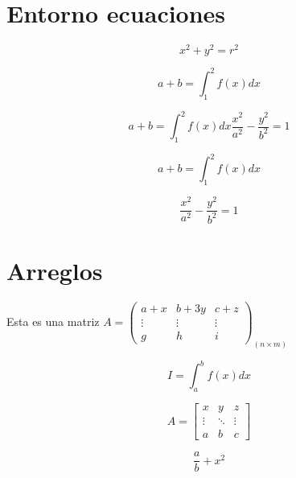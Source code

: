 \documentclass[11pt,a4paper]{article}
\author{Juan Carlos Tapia}
\begin{document}
\section{Entorno ecuaciones}

\begin{equation}
x^2+y^2=r^2
\end{equation}

\begin{equation*}
a+b=\int_{1}^{2}f(x)dx
\end{equation*}


\begin{subequations}
\begin{equation}
a+b=\int_{1}^{2}f(x)dx
\end{equation}

\begin{equation}
\frac{x^2}{a^2}-\frac{y^2}{b^2}=1
\end{equation}

\end{subequations}


\begin{equation*}
a+b=\int_{1}^{2}f(x)dx
\end{equation*}


\begin{equation}
\frac{x^2}{a^2}-\frac{y^2}{b^2}=1
\end{equation}


\section{Arreglos}


Esta es una matriz 
$
A=\left(
\begin{array}{ccc}
a+x & b+3y &c+z \\
\vdots & \vdots &\vdots \\
g & h &i
\end{array}
\right)_{(n\times m)}
$


\[I = \int_a^b {f\left( x \right)dx} \]


\[A = \left[{\begin{array}{*{20}{c}}
x & y &z\\
\vdots & \ddots & \vdots \\
a & b & c
\end{array}} \right]\]




$$\frac{a}{b}+x^{2}$$
\end{document}
